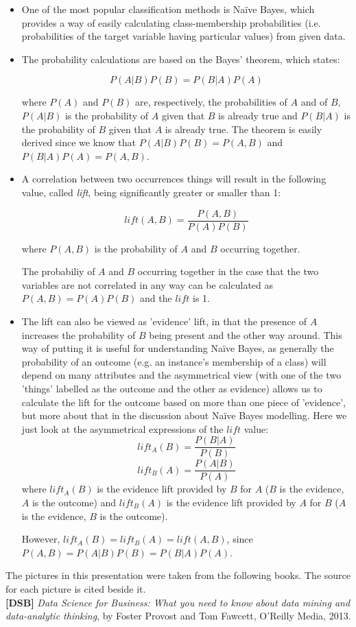 \begin{itemize}
\item One of the most popular classification methods is Na\"{i}ve Bayes, which provides a way of easily calculating class-membership probabilities (i.e. probabilities of the target variable having particular values) from given data.
\item The probability calculations are based on the Bayes' theorem, which states:

  $$P(A|B)P(B)=P(B|A)P(A)$$

  where $P(A)$ and $P(B)$ are, respectively, the probabilities of $A$ and of $B$, $P(A|B)$ is the probability of $A$ given that $B$ is already true and $P(B|A)$ is the probability of $B$ given that $A$ is already true. The theorem is easily derived since we know that $P(A|B)P(B)=P(A,B)$ and $P(B|A)P(A)=P(A,B)$.

\item A correlation between two occurrences things will result in the following value, called \emph{lift}, being significantly greater or smaller than 1:

  $$lift(A,B)=\dfrac{P(A,B)}{P(A)P(B)}$$

  where $P(A,B)$ is the probability of $A$ and $B$ occurring together.

  The probabiliy of $A$ and $B$ occurring together in the case that the two variables are not correlated in any way can be calculated as $P(A,B)=P(A)P(B)$ and the $lift$ is 1. 

\item The lift can also be viewed as 'evidence' lift, in that the presence of $A$ increases the probability of $B$ being present and the other way around. This way of putting it is useful for understanding Na\"ive Bayes, as generally the probability of an outcome (e.g. an instance's membership of a class) will depend on many attributes and the asymmetrical view (with one of the two 'things' labelled as the outcome and the other as evidence) allows us to calculate the lift for the outcome based on more than one piece of 'evidence', but more about that in the discussion about Na\"ive Bayes modelling. Here we just look at the asymmetrical expressions of the $lift$ value:
  $$lift_A(B)=\dfrac{P(B|A)}{P(B)}$$
  $$lift_B(A)=\dfrac{P(A|B)}{P(A)}$$
  where $lift_A(B)$ is the evidence lift provided by $B$ for $A$ ($B$ is the evidence, $A$ is the outcome) and $lift_B(A)$ is the evidence lift provided by $A$ for $B$ ($A$ is the evidence, $B$ is the outcome).

  However, $lift_A(B)=lift_B(A)=lift(A,B)$, since $P(A,B)=P(A|B)P(B)=P(B|A)P(A)$.

  
  \end{itemize}


\newpage
{}
The pictures in this presentation were taken from the following books. The source for each picture is cited beside it. \\

\textbf{[DSB]} \emph{Data Science for Business: What you need to know about data mining and data-analytic thinking}, by Foster Provost and Tom Fawcett, O'Reilly Media, 2013. \\




